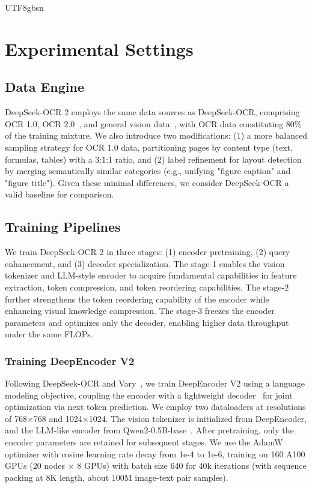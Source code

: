 \documentclass[11pt, a4paper, logo, copyright, nonumbering]{deepseek}
\begin{document}
\begin{CJK*}{UTF8}{gbsn}
\section{Experimental Settings}

\subsection{Data Engine}
\label{data}

DeepSeek-OCR 2 employs the same data sources as DeepSeek-OCR, comprising OCR 1.0, OCR 2.0~\cite{chen2024onechart,wei2024slow,liu2024focus_fox}, and general vision data~\cite{wei2025deepseek}, with OCR data constituting 80\% of the training mixture. We also introduce two modifications: (1) a more balanced sampling strategy for OCR 1.0 data, partitioning pages by content type (text, formulas, tables) with a 3:1:1 ratio, and (2) label refinement for layout detection by merging semantically similar categories (e.g., unifying "figure caption" and "figure title"). Given these minimal differences, we consider DeepSeek-OCR a valid baseline for comparison.



\subsection{Training Pipelines}
We train DeepSeek-OCR 2 in three stages: (1) encoder pretraining, (2) query enhancement, and (3) decoder specialization. The stage-1 enables the vision tokenizer and LLM-style encoder to acquire fundamental capabilities in feature extraction, token compression, and token reordering capabilities. The stage-2 further strengthens the token reordering capability of the encoder while enhancing visual knowledge compression. The stage-3 freezes the encoder parameters and optimizes only the decoder, enabling higher data throughput under the same FLOPs.

\subsubsection{Training DeepEncoder V2}
Following DeepSeek-OCR and Vary~\cite{wei2024vary}, we train DeepEncoder V2 using a language modeling objective, coupling the encoder with a lightweight decoder~\cite{OPT-IML} for joint optimization via next token prediction. We employ two dataloaders at resolutions of 768$\times$768 and 1024$\times$1024. The vision tokenizer is initialized from DeepEncoder, and the LLM-like encoder from Qwen2-0.5B-base~\cite{wang2024qwen2}. After pretraining, only the encoder parameters are retained for subsequent stages. We use the AdamW~\cite{AdamW} optimizer with cosine learning rate decay from 1e-4 to 1e-6, training on 160 A100 GPUs (20 nodes $\times$ 8 GPUs) with batch size 640 for 40k iterations (with sequence packing at 8K length, about 100M image-text pair samples).


\end{CJK*}
\end{document}
